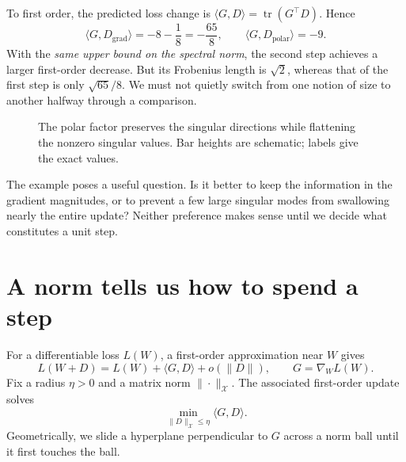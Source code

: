 To first order, the predicted loss change is \(\langle G,D\rangle=\operatorname{tr}(G^\top D)\).  Hence
\[
 \langle G,D_{\mathrm{grad}}\rangle=-8-\frac18=-\frac{65}{8},
 \qquad
 \langle G,D_{\mathrm{polar}}\rangle=-9.
\]
With the \emph{same upper bound on the spectral norm}, the second step achieves a larger first-order decrease.  But its Frobenius length is \(\sqrt2\), whereas that of the first step is only \(\sqrt{65}/8\).  We must not quietly switch from one notion of size to another halfway through a comparison.

\begin{figure}[H]
\centering
{}
\caption{The polar factor preserves the singular directions while flattening the nonzero singular values.  Bar heights are schematic; labels give the exact values.}
\label{fig:N20261017-singular-values}
\end{figure}

The example poses a useful question.  Is it better to keep the information in the gradient magnitudes, or to prevent a few large singular modes from swallowing nearly the entire update?  Neither preference makes sense until we decide what constitutes a unit step.

\section{A norm tells us how to spend a step}

For a differentiable loss \(L(W)\), a first-order approximation near \(W\) gives
\[
 L(W+D)=L(W)+\langle G,D\rangle+o(\|D\|),
 \qquad G=\nabla_W L(W).
\]
Fix a radius \(\eta>0\) and a matrix norm \(\|\cdot\|_{\mathcal X}\).  The associated first-order update solves
\begin{equation}
 \min_{\|D\|_{\mathcal X}\leq\eta}\langle G,D\rangle.
 \label{eq:N20261017-linear-oracle}
\end{equation}
Geometrically, we slide a hyperplane perpendicular to \(G\) across a norm ball until it first touches the ball.

